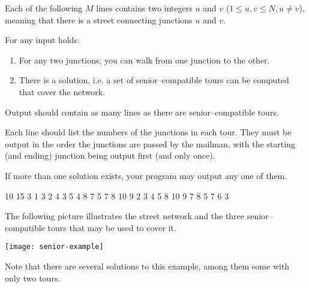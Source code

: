 \documentclass{boi2014}
\begin{document}
    Each of the following $M$ lines contains two integers $u$ and $v$
    ($1 \le u, v \le N, u \neq v$), meaning that
    there is a street connecting junctions $u$ and $v$.

    For any input holds:
    \begin{enumerate}
        \item For any two junctions, you can walk from one junction to the other.
        \item There is a solution, i.e. a set of senior--compatible tours can be
        computed that cover the network.
    \end{enumerate}

    \Output
    Output should contain as many lines as there are senior--compatible tours.

    Each line should list the numbers of the junctions in each tour. They must
    be output in the order the junctions are passed by the mailman, with the
    starting (and ending) junction being output first (and only once).

    If more than one solution exists, your program may output any one of them.

    \Example

    \example
    {
        10 15  3  1 3  2 4  3 5  4 8  7  5 7  8  10  9
    }
    {
        2 3 4 5 8 10 9  7 8  5 7 6 3
    }
    {
        The following picture illustrates the street network and the three
        senior--compatible tours that may be used to cover it.

        \texttt{[image: senior-example]}

        Note that there are several solutions to this example, among them some
        with only two tours.
    
    }
\end{document}
